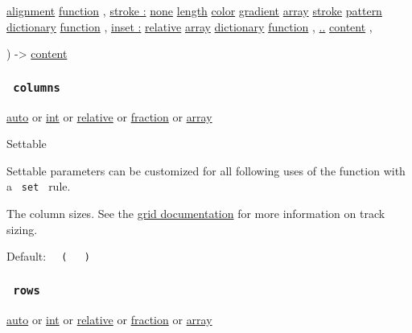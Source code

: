 {\href{/docs/reference/layout/alignment/}{alignment}
\href{/docs/reference/foundations/function/}{function} , } {
\hyperref[parameters-stroke]{stroke :}
\href{/docs/reference/foundations/none/}{none}
\href{/docs/reference/layout/length/}{length}
\href{/docs/reference/visualize/color/}{color}
\href{/docs/reference/visualize/gradient/}{gradient}
\href{/docs/reference/foundations/array/}{array}
\href{/docs/reference/visualize/stroke/}{stroke}
\href{/docs/reference/visualize/pattern/}{pattern}
\href{/docs/reference/foundations/dictionary/}{dictionary}
\href{/docs/reference/foundations/function/}{function} , } {
\hyperref[parameters-inset]{inset :}
\href{/docs/reference/layout/relative/}{relative}
\href{/docs/reference/foundations/array/}{array}
\href{/docs/reference/foundations/dictionary/}{dictionary}
\href{/docs/reference/foundations/function/}{function} , } {
\hyperref[parameters-children]{..}
\href{/docs/reference/foundations/content/}{content} , }

) -\textgreater{} \href{/docs/reference/foundations/content/}{content}

\subsubsection{\texorpdfstring{\texttt{\ columns\ }}{ columns }}\label{parameters-columns}

\href{/docs/reference/foundations/auto/}{auto} {or}
\href{/docs/reference/foundations/int/}{int} {or}
\href{/docs/reference/layout/relative/}{relative} {or}
\href{/docs/reference/layout/fraction/}{fraction} {or}
\href{/docs/reference/foundations/array/}{array}

{{ Settable }}

\label{parameters-columns-settable-tooltip}
Settable parameters can be customized for all following uses of the
function with a \texttt{\ set\ } rule.

The column sizes. See the \href{/docs/reference/layout/grid/}{grid
documentation} for more information on track sizing.

Default:
\texttt{\ }{\texttt{\ (\ }}\texttt{\ }{\texttt{\ )\ }}\texttt{\ }

\subsubsection{\texorpdfstring{\texttt{\ rows\ }}{ rows }}\label{parameters-rows}

\href{/docs/reference/foundations/auto/}{auto} {or}
\href{/docs/reference/foundations/int/}{int} {or}
\href{/docs/reference/layout/relative/}{relative} {or}
\href{/docs/reference/layout/fraction/}{fraction} {or}
\href{/docs/reference/foundations/array/}{array}

